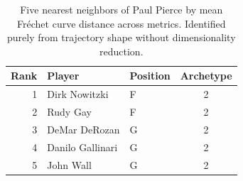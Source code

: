 \begin{table}[htbp]
  \centering\small
  \begin{tabular}{rllc}
    \toprule
    Rank & Player & Position & Archetype \\
    \midrule
    1 & Dirk Nowitzki & F & 2 \\
    2 & Rudy Gay & F & 2 \\
    3 & DeMar DeRozan & G & 2 \\
    4 & Danilo Gallinari & G & 2 \\
    5 & John Wall & G & 2 \\
    \bottomrule
  \end{tabular}
  \caption{Five nearest neighbors of Paul Pierce by mean Fr\'{e}chet curve distance across metrics. Identified purely from trajectory shape without dimensionality reduction.}
  \label{tab:Paul_Pierce_frechet_curve_neighbors}
\end{table}

